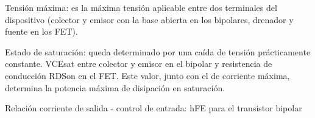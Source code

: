 \documentclass[10pt,letterpaper]{article}
\begin{document}
Tensión máxima: es la máxima tensión aplicable entre dos terminales del dispositivo (colector y emisor con la base abierta en los bipolares, drenador y fuente en los FET).

Estado de saturación: queda determinado por una caída de tensión prácticamente constante. VCEsat entre colector y emisor en el bipolar y resistencia de conducción RDSon en el FET. Este valor, junto con el de corriente máxima, determina la potencia máxima de disipación en saturación.

Relación corriente de salida - control de entrada: hFE para el transistor bipolar 
\end{document}
